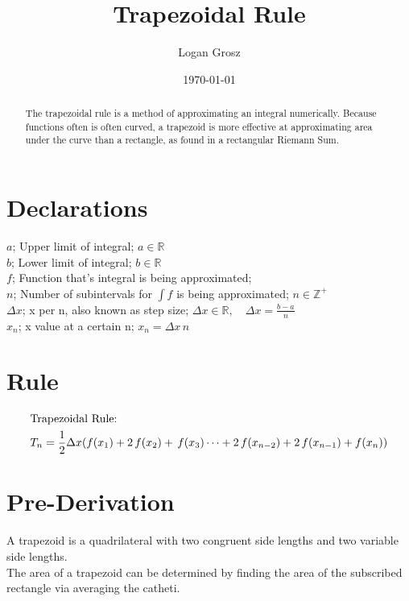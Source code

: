 \documentclass{article}
\begin{document}
	
\author{Logan Grosz}
\title{Trapezoidal Rule}
\date{\today}

\maketitle

\begin{abstract}
\noindent The trapezoidal rule is a method of approximating an integral numerically. Because functions often is often curved, a trapezoid is more effective at approximating area under the curve than a rectangle, as found in a rectangular Riemann Sum.
\end{abstract}

\section{Declarations}

$a$; Upper limit of integral; $a\in \mathbb{R} $\\
$b$; Lower limit of integral; $b  \in \mathbb{R}$\\
$f$; Function that's integral is being approximated;\\
$n$; Number of subintervals for $\int f$ is being approximated; $n \in \mathbb{Z^+}$\\
$\Delta x$; x per n, also known as step size; $\Delta x \in \mathbb{R},\quad \Delta x = \frac{b-a}{n}$\\
$x_n$; x value at a certain n; $x_n = \Delta x \, n$

\section{Rule}

\begin{gather}
\intertext{Trapezoidal Rule:}
	T_n = \dfrac{1}{2} \Delta x (f(x_1) + 2\,f(x_2) + \,f(x_3) \cdots + 2\,f(x_{n-2}) + 2\,f(x_{n-1}) + f(x_n))
\end{gather}

\section{Pre-Derivation}
A trapezoid is a quadrilateral with two congruent side lengths and two variable side lengths.\\

\noindent The area of a trapezoid can be determined by finding the area of the subscribed rectangle via averaging the catheti.\\
\end{document}
